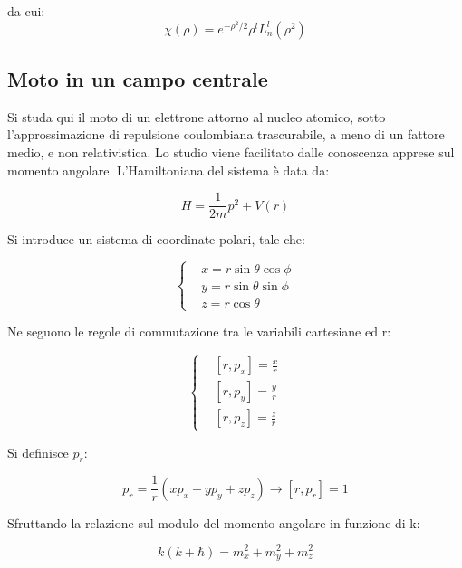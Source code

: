 \documentclass{article}
\begin{document}
da cui:
\begin{equation}
  \chi(\rho)=e^{-\rho^2/2} \rho^l L_n^l(\rho^2)
\end{equation}




\subsection{Moto in un campo centrale}
Si studa qui il moto di un elettrone attorno al nucleo atomico, sotto l'approssimazione di repulsione coulombiana trascurabile, a meno di un fattore medio, e non relativistica.
Lo studio viene facilitato dalle conoscenza apprese sul momento angolare.
L'Hamiltoniana del sistema è data da:

\begin{equation}
  H=\frac{1}{2m}p^2+V(r)
\end{equation}

Si introduce un sistema di coordinate polari, tale che:

\begin{equation}
  \left\{
  \begin{aligned}
     & x=r\sin{\theta}\cos{\phi} \\
     & y=r\sin{\theta}\sin{\phi} \\
     & z=r\cos{\theta}
  \end{aligned}
  \right.
\end{equation}

Ne seguono le regole di commutazione tra le variabili cartesiane ed r:

\begin{equation}
  \left\{
  \begin{aligned}
     & [r, p_x]=\frac{x}{r} \\
     & [r, p_y]=\frac{y}{r} \\
     & [r, p_z]=\frac{z}{r}
  \end{aligned}
  \right.
\end{equation}

Si definisce $p_r$:

\begin{equation}
  p_r=\frac{1}{r}(xp_x+yp_y+zp_z) \rightarrow [r, p_r]=1
\end{equation}

Sfruttando la relazione sul modulo del momento angolare in funzione di k:

\begin{equation}
  k(k+\hbar)=m_x^2+m_y^2+m_z^2
\end{equation}
\end{document}
